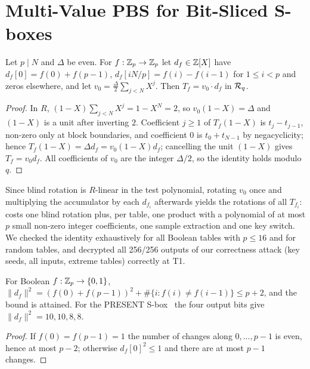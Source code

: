 \section{Multi-Value PBS for Bit-Sliced S-boxes}\label{sec:construction}
\begin{lemma}\label{lem:factor}
Let $p\mid N$ and $\Delta$ be even. For $f:\mathbb{Z}_p\to\mathbb{Z}_p$ let $d_f\in\mathbb{Z}[X]$ have
$d_f[0]=f(0)+f(p-1)$, $d_f[iN/p]=f(i)-f(i-1)$ for $1\le i<p$ and zeros elsewhere, and let
$v_0=\frac{\Delta}{2}\sum_{j<N}X^j$. Then $T_f=v_0\cdot d_f$ in $\mathcal{R}_q$.
\end{lemma}
\begin{proof}
In $R$, $(1-X)\sum_{j<N}X^j=1-X^N=2$, so $v_0(1-X)=\Delta$ and $(1-X)$ is a unit after
inverting $2$. Coefficient $j\ge1$ of $T_f(1-X)$ is $t_j-t_{j-1}$, non-zero only at block
boundaries, and coefficient $0$ is $t_0+t_{N-1}$ by negacyclicity; hence
$T_f(1-X)=\Delta d_f=v_0(1-X)d_f$; cancelling the unit $(1-X)$ gives $T_f=v_0d_f$. All coefficients of $v_0$ are the
integer $\Delta/2$, so the identity holds modulo $q$.
\end{proof}
Since blind rotation is $R$-linear in the test polynomial, rotating $v_0$ once and multiplying
the accumulator by each $d_{f_i}$ afterwards yields the rotations of all $T_{f_i}$: \MVPBS{}
costs one blind rotation plus, per table, one product with a polynomial of at most $p$ small
non-zero integer coefficients, one sample extraction and one key switch.
We checked the identity exhaustively for all Boolean tables with $p\le 16$ and for random
tables, and \MVPBS{} decrypted all 256/256 outputs of our correctness attack (key seeds,
all inputs, extreme tables) correctly at T1.

\begin{lemma}[norm of $d_f$]\label{lem:norm}
For Boolean $f:\mathbb{Z}_p\to\{0,1\}$, $\|d_f\|^2=(f(0)+f(p-1))^2+\#\{i: f(i)\neq f(i-1)\}\le p+2$,
and the bound is attained. For the PRESENT S-box~\cite{PRESENT07} the four output bits give
$\|d_f\|^2=10,10,8,8$.
\end{lemma}
\begin{proof}
If $f(0)=f(p-1)=1$ the number of changes along $0,\dots,p-1$ is even, hence at most $p-2$;
otherwise $d_f[0]^2\le1$ and there are at most $p-1$ changes.
\end{proof}

